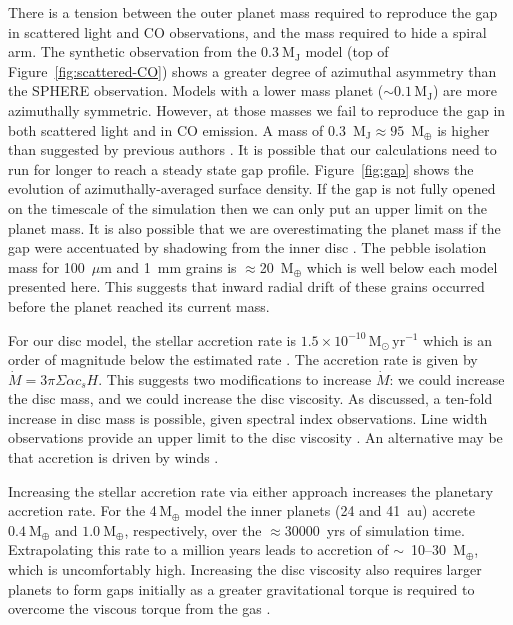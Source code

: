 \documentclass[usenatbib,a4paper,times]{mnras}
\renewcommand{\sun}{\mathrm{M}_{\odot}}
\renewcommand{\earth}{\mathrm{M}_{\oplus}}
\begin{document}
There is a tension between the outer planet mass required to reproduce the gap
in scattered light and CO observations, and the mass required to hide a spiral
arm. The synthetic observation from the $0.3~\mathrm{M_J}$ model (top of
Figure~\ref{fig:scattered-CO}) shows a greater degree of azimuthal asymmetry
than the SPHERE observation. Models with a lower mass planet ($\sim
0.1\,\mathrm{M_J}$) are more azimuthally symmetric. However, at those masses we
fail to reproduce the gap in both scattered light and in CO emission. A mass of
0.3~$\mathrm{M_J} \approx 95$~$\earth{}$ is higher than suggested by previous
authors \citep{dong:2017b, van-boekel:2017}. It is possible that our
calculations need to run for longer to reach a steady state gap profile.
Figure~\ref{fig:gap} shows the evolution of azimuthally-averaged surface
density. If the gap is not fully opened on the timescale of the simulation then
we can only put an upper limit on the planet mass. It is also possible that we
are overestimating the planet mass if the gap were accentuated by shadowing from
the inner disc \citep{debes:2013, debes:2017, poteet:2018}.  The pebble
isolation mass \citep{bitsch:2018} for 100~$\mu$m and 1~mm grains is
$\approx$20~$\earth{}$ which is well below each model presented here.  This
suggests that inward radial drift of these grains occurred before the planet
reached its current mass.

For our disc model, the stellar accretion rate is $1.5\times
10^{-10}\,\sun{}\,\mathrm{yr}^{-1}$ which is an order of magnitude below the
estimated rate \citep{brickhouse:2012}. The accretion rate is given by $\dot{M}
= 3\pi\Sigma\alpha c_s H$. This suggests two modifications to increase
$\dot{M}$: we could increase the disc mass, and we could increase the disc
viscosity. As discussed, a ten-fold increase in disc mass is possible, given
spectral index observations. Line width observations provide an upper limit
to the disc viscosity \citep{flaherty:2018}. An alternative may be that
accretion is driven by winds \citep{simon:2018}.

Increasing the stellar accretion rate via either approach increases the
planetary accretion rate. For the 4$\,\earth{}$ model the inner planets (24 and
41~au) accrete $0.4~\earth{}$ and $1.0~\earth{}$, respectively, over the
$\approx30000$~yrs of simulation time. Extrapolating this rate to a million
years leads to accretion of $\sim$~10--30~$\earth{}$, which is uncomfortably
high. Increasing the disc viscosity also requires larger planets to form gaps
initially as a greater gravitational torque is required to overcome the viscous
torque from the gas \citep{dipierro:2016}.
\end{document}
